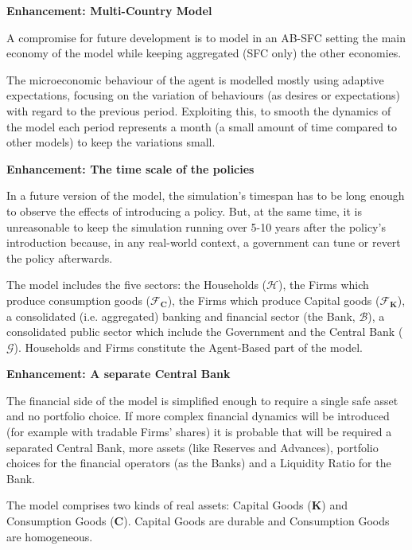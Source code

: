 \documentclass[a4paper, headings=standardclasses]{scrartcl}
\numberwithin{equation}{subsection}
\newenvironment{enh}[1][]{\begin{framed}\noindent\textbf{Enhancement: #1}\par}{\end{framed}}
\begin{document}
\begin{enh}[Multi-Country Model]
    A compromise for future development is to model in an AB-SFC setting the main economy of the model while keeping aggregated (SFC only) the other economies.
\end{enh}

The microeconomic behaviour of the agent is modelled mostly using adaptive expectations, focusing on the variation of behaviours (as desires or expectations) with regard to the previous period.
Exploiting this, to smooth the dynamics of the model each period represents a month (a small amount of time compared to other models) to keep the variations small.

\begin{enh}[The time scale of the policies]
    In a future version of the model, the simulation's timespan has to be long enough to observe the effects of introducing a policy. But, at the same time, it is unreasonable to keep the simulation running over 5-10 years after the policy's introduction because, in any real-world context, a government can tune or revert the policy afterwards.
\end{enh}

The model includes the five sectors: the Households ($\mathcal{H}$), the Firms which produce consumption goods ($\mathcal{F}_{\mathbf{C}}$), the Firms which produce Capital goods ($\mathcal{F}_{\mathbf{K}}$), a consolidated (i.e. aggregated) banking and financial sector (the Bank, $\mathcal{B}$), a consolidated public sector which include the Government and the Central Bank ($\mathcal{G}$). Households and Firms constitute the Agent-Based part of the model.

\begin{enh}[A separate Central Bank]
    The financial side of the model is simplified enough to require a single safe asset and no portfolio choice.
    If more complex financial dynamics will be introduced (for example with tradable Firms' shares) it is probable that will be required a separated Central Bank, more assets (like Reserves and Advances), portfolio choices for the financial operators (as the Banks) and a Liquidity Ratio for the Bank.
\end{enh}

The model comprises two kinds of real assets: Capital Goods ($\mathbf{K}$) and Consumption Goods ($\mathbf{C}$).
Capital Goods are durable and Consumption Goods are homogeneous.
\end{document}
